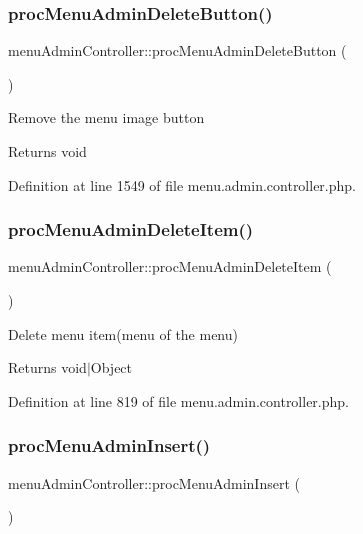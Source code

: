 \subsubsection{\texorpdfstring{proc\+Menu\+Admin\+Delete\+Button()}{procMenuAdminDeleteButton()}}
{\footnotesize\ttfamily menu\+Admin\+Controller\+::proc\+Menu\+Admin\+Delete\+Button (\begin{DoxyParamCaption}{ }\end{DoxyParamCaption})}

Remove the menu image button \begin{DoxyReturn}{Returns}
void 
\end{DoxyReturn}


Definition at line 1549 of file menu.\+admin.\+controller.\+php.

\hypertarget{classmenuAdminController_a95f3b583f04dcd805696f7fd33b13d9c}{}\label{classmenuAdminController_a95f3b583f04dcd805696f7fd33b13d9c} 
\subsubsection{\texorpdfstring{proc\+Menu\+Admin\+Delete\+Item()}{procMenuAdminDeleteItem()}}
{\footnotesize\ttfamily menu\+Admin\+Controller\+::proc\+Menu\+Admin\+Delete\+Item (\begin{DoxyParamCaption}{ }\end{DoxyParamCaption})}

Delete menu item(menu of the menu) \begin{DoxyReturn}{Returns}
void$\vert$\+Object 
\end{DoxyReturn}


Definition at line 819 of file menu.\+admin.\+controller.\+php.

\hypertarget{classmenuAdminController_a3c022826d1ffe76b9d5557d3f126ff97}{}\label{classmenuAdminController_a3c022826d1ffe76b9d5557d3f126ff97} 
\subsubsection{\texorpdfstring{proc\+Menu\+Admin\+Insert()}{procMenuAdminInsert()}}
{\footnotesize\ttfamily menu\+Admin\+Controller\+::proc\+Menu\+Admin\+Insert (\begin{DoxyParamCaption}{ }\end{DoxyParamCaption})}

